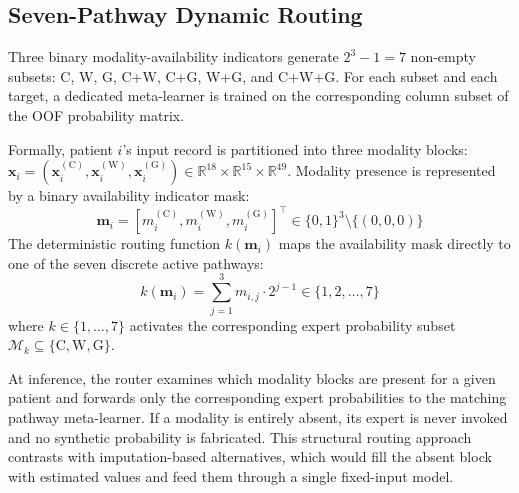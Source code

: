 \documentclass[10pt,twocolumn,letterpaper]{article}
\begin{document}
\subsection{Seven-Pathway Dynamic Routing}
Three binary modality-availability indicators generate $2^{3}-1=7$ non-empty subsets: C, W, G, C+W, C+G, W+G, and C+W+G. For each subset and each target, a dedicated meta-learner is trained on the corresponding column subset of the OOF probability matrix.

Formally, patient $i$'s input record is partitioned into three modality blocks: $\mathbf{x}_i = (\mathbf{x}_i^{(\text{C})}, \mathbf{x}_i^{(\text{W})}, \mathbf{x}_i^{(\text{G})}) \in \mathbb{R}^{18} \times \mathbb{R}^{15} \times \mathbb{R}^{49}$. Modality presence is represented by a binary availability indicator mask:
\begin{equation}
\label{eq:mask}
\mathbf{m}_i = \left[m_i^{(\text{C})}, m_i^{(\text{W})}, m_i^{(\text{G})}\right]^\top \in \{0, 1\}^3 \setminus \{(0,0,0)\}
\end{equation}
The deterministic routing function $k(\mathbf{m}_i)$ maps the availability mask directly to one of the seven discrete active pathways:
\begin{equation}
\label{eq:routing}
k(\mathbf{m}_i) = \sum_{j=1}^{3} m_{i,j} \cdot 2^{j-1} \in \{1, 2, \dots, 7\}
\end{equation}
where $k \in \{1, \dots, 7\}$ activates the corresponding expert probability subset $\mathcal{M}_k \subseteq \{\text{C}, \text{W}, \text{G}\}$.

At inference, the router examines which modality blocks are present for a given patient and forwards only the corresponding expert probabilities to the matching pathway meta-learner. If a modality is entirely absent, its expert is never invoked and no synthetic probability is fabricated. This structural routing approach contrasts with imputation-based alternatives, which would fill the absent block with estimated values and feed them through a single fixed-input model.
\end{document}
